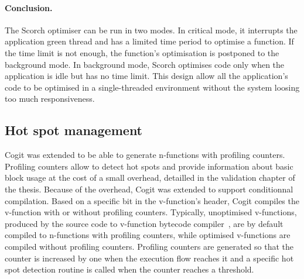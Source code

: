 \documentclass[a4paper,12pt,twoside]{../includes/ThesisStyle}
\begin{document}

\paragraph{Conclusion.}The Scorch optimiser can be run in two modes. In critical mode, it interrupts the application green thread and has a limited time period to optimise a function. If the time limit is not enough, the function's optimisation is postponed to the background mode. In background mode, Scorch optimises code only when the application is idle but has no time limit. This design allow all the application's code to be optimised in a single-threaded environment without the system loosing too much responsiveness.

\subsection{Hot spot management}
\label{sec:hotSpot}

Cogit was extended to be able to generate n-functions with profiling counters. Profiling counters allow to detect hot spots and provide information about basic block usage at the cost of a small overhead, detailled in the validation chapter of the thesis. Because of the overhead, Cogit was extended to support conditionnal compilation. Based on a specific bit in the v-function's header, Cogit compiles the v-function with or without profiling counters. Typically, unoptimised v-functions, produced by the source code to v-function bytecode compiler~\cite{Bera13a}, are by default compiled to n-functions with profiling counters, while optimised v-functions are compiled without profiling counters. Profiling counters are generated so that the counter is increased by one when the execution flow reaches it and a specific hot spot detection routine is called when the counter reaches a threshold.
\end{document}
